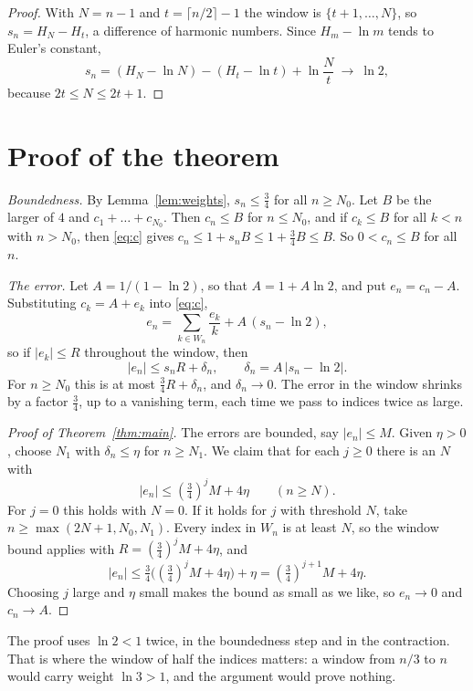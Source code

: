 \documentclass[11pt]{amsart}
\theoremstyle{remark}
\begin{document}
\begin{proof}
With $N=n-1$ and $t=\lceil n/2\rceil-1$ the window is $\{t+1,\dots,N\}$, so $s_n=H_N-H_t$, a difference of harmonic numbers. Since $H_m-\ln m$ tends to Euler's constant,
\[
s_n=(H_N-\ln N)-(H_t-\ln t)+\ln\frac{N}{t}\ \longrightarrow\ \ln 2,
\]
because $2t\le N\le2t+1$.
\end{proof}

\section{Proof of the theorem}

\emph{Boundedness.} By Lemma~\ref{lem:weights}, $s_n\le\tfrac34$ for all $n\ge N_0$. Let $B$ be the larger of $4$ and $c_1+\dots+c_{N_0}$. Then $c_n\le B$ for $n\le N_0$, and if $c_k\le B$ for all $k<n$ with $n>N_0$, then \eqref{eq:c} gives $c_n\le1+s_nB\le1+\tfrac34B\le B$. So $0<c_n\le B$ for all $n$.

\emph{The error.} Let $A=1/(1-\ln2)$, so that $A=1+A\ln2$, and put $e_n=c_n-A$. Substituting $c_k=A+e_k$ into \eqref{eq:c},
\begin{equation}\label{eq:e}
e_n=\sum_{k\in W_n}\frac{e_k}{k}+A\,(s_n-\ln2),
\end{equation}
so if $|e_k|\le R$ throughout the window, then
\[
|e_n|\le s_n R+\delta_n,\qquad \delta_n=A\,|s_n-\ln2|.
\]
For $n\ge N_0$ this is at most $\tfrac34R+\delta_n$, and $\delta_n\to0$. The error in the window shrinks by a factor $\tfrac34$, up to a vanishing term, each time we pass to indices twice as large.

\begin{proof}[Proof of Theorem~\ref{thm:main}]
The errors are bounded, say $|e_n|\le M$. Given $\eta>0$, choose $N_1$ with $\delta_n\le\eta$ for $n\ge N_1$. We claim that for each $j\ge0$ there is an $N$ with
\[
|e_n|\le(\tfrac34)^jM+4\eta\qquad(n\ge N).
\]
For $j=0$ this holds with $N=0$. If it holds for $j$ with threshold $N$, take $n\ge\max(2N+1,N_0,N_1)$. Every index in $W_n$ is at least $N$, so the window bound applies with $R=(\tfrac34)^jM+4\eta$, and
\[
|e_n|\le\tfrac34\bigl((\tfrac34)^jM+4\eta\bigr)+\eta=(\tfrac34)^{j+1}M+4\eta .
\]
Choosing $j$ large and $\eta$ small makes the bound as small as we like, so $e_n\to0$ and $c_n\to A$.
\end{proof}

The proof uses $\ln2<1$ twice, in the boundedness step and in the contraction. That is where the window of half the indices matters: a window from $n/3$ to $n$ would carry weight $\ln3>1$, and the argument would prove nothing.
\end{document}
